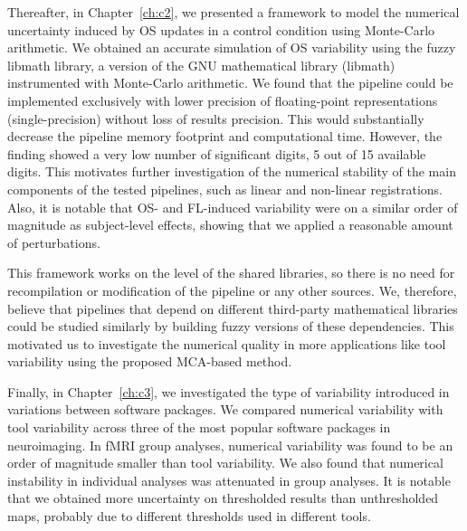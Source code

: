 Thereafter, in Chapter~\ref{ch:c2}, we presented a framework to model the numerical uncertainty induced by OS updates in a control condition using Monte-Carlo arithmetic. 
We obtained an accurate simulation of OS variability using the fuzzy libmath library,
a version of the GNU mathematical library (libmath) instrumented with Monte-Carlo arithmetic.
We found that the pipeline could be implemented exclusively with lower precision of floating-point representations (single-precision)
without loss of results precision. This would substantially decrease the pipeline memory footprint and computational time.
However, the finding showed a very low number of significant digits, 5 out of 15 available digits.
This motivates further investigation of the numerical stability of the main components of the tested pipelines, such as linear and non-linear registrations.
Also, it is notable that OS- and FL-induced variability were on a similar order of magnitude as subject-level effects,
showing that we applied a reasonable amount of perturbations.

This framework works on the level of the shared libraries, so there is no need for recompilation or modification
of the pipeline or any other sources.
We, therefore, believe that pipelines that depend
on different third-party mathematical libraries could be studied similarly by building fuzzy
versions of these dependencies. This motivated us to investigate the numerical quality in
more applications like tool variability using the proposed MCA-based method.

Finally, in Chapter~\ref{ch:c3}, we investigated the type of variability introduced in variations between software packages.
We compared numerical variability with tool variability across three of the most popular software packages in neuroimaging.
In fMRI group analyses, numerical variability was found to be an order of magnitude smaller than tool variability.
We also found that numerical instability in individual analyses was attenuated in group analyses.
It is notable that we obtained more uncertainty on thresholded results than unthresholded maps, probably due to
different thresholds used in different tools.


